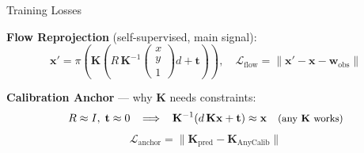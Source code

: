\documentclass[
  english,
  aspectratio=169,
]{tumbeamer}
\begin{document}
\begin{frame}{Training Losses}

\vskip8pt
\textbf{Flow Reprojection} (self-supervised, main signal):
\begin{equation*}
  \mathbf{x}' = \pi\!\left(\mathbf{K}\left(R\,\mathbf{K}^{-1}\!\begin{pmatrix} x \\ y \\ 1\end{pmatrix}\!d + \mathbf{t}\right)\right), \quad \mathcal{L}_\text{flow} = \|\mathbf{x}' - \mathbf{x} - \mathbf{w}_\text{obs}\|
\end{equation*}

\vskip8pt
\textbf{Calibration Anchor} --- why $\mathbf{K}$ needs constraints:
\begin{equation*}
  R \approx I,\; \mathbf{t} \approx 0 \;\;\implies\;\; \mathbf{K}^{-1}(d\,\mathbf{K}\mathbf{x} + \mathbf{t}) \approx \mathbf{x} \quad \text{\small (any $\mathbf{K}$ works)}
\end{equation*}
\vskip-2pt
\begin{equation*}
  \mathcal{L}_\text{anchor} = \|\mathbf{K}_\text{pred} - \mathbf{K}_\text{AnyCalib}\|
\end{equation*}

\end{frame}
\end{document}
